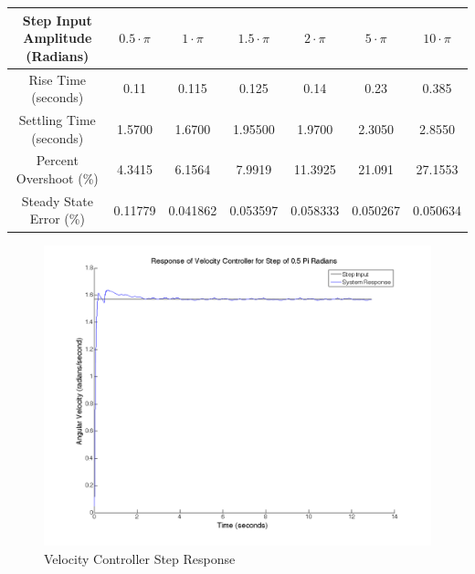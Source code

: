 \documentclass{article}
\theoremstyle{plain}
\theoremstyle{definition}
\theoremstyle{remark}
\begin{document}
\begin{table}[htb]
\begin{center}
    \begin{tabular}{|c|c|c|c|c|c|c|}
        \hline
        Step Input Amplitude (Radians) & $0.5 \cdot \pi$ & $1 \cdot \pi$ & $1.5 \cdot \pi$ & $2 \cdot \pi$ & $5 \cdot \pi$ & $10 \cdot \pi$ \\ \hline
        Rise Time (seconds)            & 0.11            & 0.115         & 0.125           & 0.14          & 0.23          & 0.385          \\ 
        Settling Time (seconds)        & 1.5700          &1.6700          & 1.95500           & 1.9700        & 2.3050        & 2.8550         \\ 
        Percent Overshoot (\%)         & 4.3415          & 6.1564        & 7.9919          & 11.3925       & 21.091        & 27.1553        \\ 
        Steady State Error (\%)        & 0.11779         & 0.041862      & 0.053597        & 0.058333      & 0.050267      & 0.050634       \\
        \hline
    \end{tabular}
\end{center}
\end{table}

\begin{figure}[htb]
\begin{center}
\includegraphics[width = 12cm]{velstep0_5Pi.png}
\caption{Velocity Controller Step Response}
\label{q6_1}
\end{center}
\end{figure}
\end{document}
